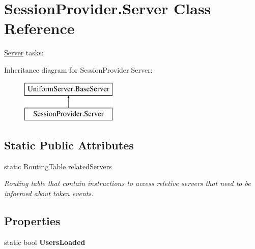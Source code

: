 \hypertarget{class_session_provider_1_1_server}{}\section{Session\+Provider.\+Server Class Reference}
\label{class_session_provider_1_1_server}


\mbox{\hyperlink{class_session_provider_1_1_server}{Server}} tasks\+:  


Inheritance diagram for Session\+Provider.\+Server\+:\begin{figure}[H]
\begin{center}
\leavevmode
\includegraphics[height=2.000000cm]{d8/d17/class_session_provider_1_1_server}
\end{center}
\end{figure}
\subsection*{Static Public Attributes}
\begin{DoxyCompactItemize}
\item 
static \mbox{\hyperlink{class_pipes_provider_1_1_networking_1_1_routing_1_1_routing_table}{Routing\+Table}} \mbox{\hyperlink{class_session_provider_1_1_server_a1738a442f750af35694a05d7cfdb4a71}{related\+Servers}}
\begin{DoxyCompactList}\small\item\em Routing table that contain instructions to access reletive servers that need to be informed about token events. \end{DoxyCompactList}\end{DoxyCompactItemize}
\subsection*{Properties}
\begin{DoxyCompactItemize}
\item 
\mbox{\label{class_session_provider_1_1_server_a7ccb7c8e5465c2778d961034fcd6ac6f}} 
static bool {\bfseries Users\+Loaded}
\end{DoxyCompactItemize}
